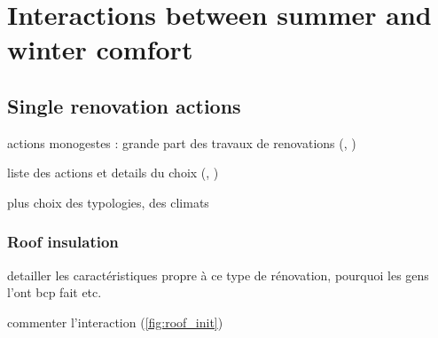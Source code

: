 \documentclass[11pt]{article}
\begin{document}

\clearpage
\section{Interactions between summer and winter comfort}
\label{sec:inter}

    \subsection{Single renovation actions} %
    \label{sub:single_renovation_actions}
    
    actions monogestes : grande part des travaux de renovations (\cite{ademe_typologie_2019}, \cite{onre_renovation_2022})


    liste des actions et details du choix (\cite{i4ce_trajectoires_2023}, \cite{peuportier_resiliance_2023})

    plus choix des typologies, des climats

        \subsubsection{Roof insulation} %
        \label{ssub:roof_insulation}
        
            detailler les caractéristiques propre à ce type de rénovation, pourquoi les gens l'ont bcp fait etc. 

            commenter l'interaction (\ref{fig:roof_init})
\end{document}
